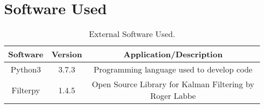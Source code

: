 \chapter{Software Used}

\begin{table}[ht]
	\begin{center}
		\begin{tabular}{| c | c | c |}
			\hline Software & Version & Application/Description\\ 
			\hline Python3 & 3.7.3 & Programming language used to develop code \\
			\hline Filterpy & 1.4.5 & Open Source Library for Kalman Filtering by Roger Labbe \\
			\hline
		\end{tabular}
	\end{center}
	\caption{External Software Used.}
\end{table}
